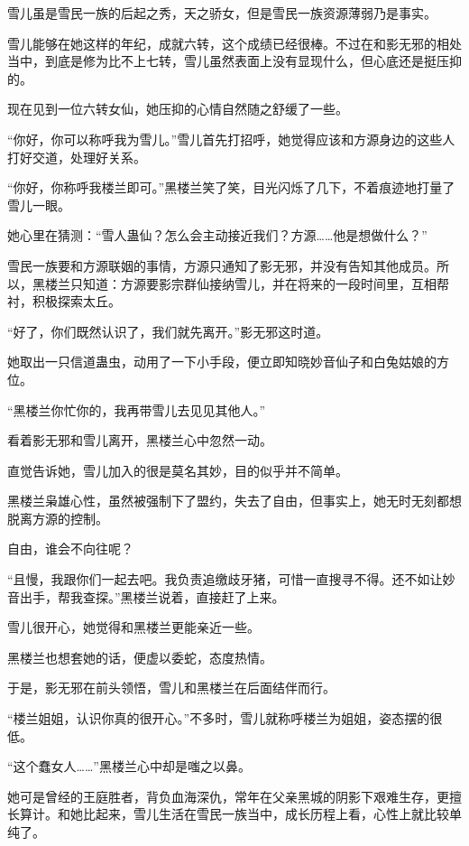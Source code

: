 
\begin{this_body}



雪儿虽是雪民一族的后起之秀，天之骄女，但是雪民一族资源薄弱乃是事实。

雪儿能够在她这样的年纪，成就六转，这个成绩已经很棒。不过在和影无邪的相处当中，到底是修为比不上七转，雪儿虽然表面上没有显现什么，但心底还是挺压抑的。

现在见到一位六转女仙，她压抑的心情自然随之舒缓了一些。

“你好，你可以称呼我为雪儿。”雪儿首先打招呼，她觉得应该和方源身边的这些人打好交道，处理好关系。

“你好，你称呼我楼兰即可。”黑楼兰笑了笑，目光闪烁了几下，不着痕迹地打量了雪儿一眼。

她心里在猜测：“雪人蛊仙？怎么会主动接近我们？方源……他是想做什么？”

雪民一族要和方源联姻的事情，方源只通知了影无邪，并没有告知其他成员。所以，黑楼兰只知道：方源要影宗群仙接纳雪儿，并在将来的一段时间里，互相帮衬，积极探索太丘。

“好了，你们既然认识了，我们就先离开。”影无邪这时道。

她取出一只信道蛊虫，动用了一下小手段，便立即知晓妙音仙子和白兔姑娘的方位。

“黑楼兰你忙你的，我再带雪儿去见见其他人。”

看着影无邪和雪儿离开，黑楼兰心中忽然一动。

直觉告诉她，雪儿加入的很是莫名其妙，目的似乎并不简单。

黑楼兰枭雄心性，虽然被强制下了盟约，失去了自由，但事实上，她无时无刻都想脱离方源的控制。

自由，谁会不向往呢？

“且慢，我跟你们一起去吧。我负责追缴歧牙猪，可惜一直搜寻不得。还不如让妙音出手，帮我查探。”黑楼兰说着，直接赶了上来。

雪儿很开心，她觉得和黑楼兰更能亲近一些。

黑楼兰也想套她的话，便虚以委蛇，态度热情。

于是，影无邪在前头领悟，雪儿和黑楼兰在后面结伴而行。

“楼兰姐姐，认识你真的很开心。”不多时，雪儿就称呼楼兰为姐姐，姿态摆的很低。

“这个蠢女人……”黑楼兰心中却是嗤之以鼻。

她可是曾经的王庭胜者，背负血海深仇，常年在父亲黑城的阴影下艰难生存，更擅长算计。和她比起来，雪儿生活在雪民一族当中，成长历程上看，心性上就比较单纯了。


\end{this_body}
